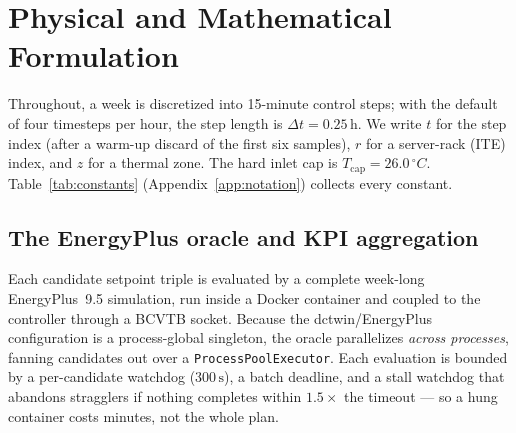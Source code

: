 \documentclass[11pt]{article}
\newcommand{\degC}{\ensuremath{^{\circ}}C}
\newcommand{\Tcap}{T_{\mathrm{cap}}}
\newcommand{\code}[1]{\texttt{\small #1}}
\begin{document}
\section{Physical and Mathematical Formulation}
\label{sec:formulation}

Throughout, a week is discretized into 15-minute control steps; with the default of four
timesteps per hour, the step length is \(\Delta t = 0.25\,\mathrm{h}\). We write \(t\) for
the step index (after a warm-up discard of the first six samples), \(r\) for a server-rack
(ITE) index, and \(z\) for a thermal zone. The hard inlet cap is
\(\Tcap = 26.0\,\degC\). Table~\ref{tab:constants} (Appendix~\ref{app:notation}) collects
every constant.

\subsection{The EnergyPlus oracle and KPI aggregation}
\label{sec:oracle}
Each candidate setpoint triple is evaluated by a complete week-long EnergyPlus~9.5
simulation, run inside a Docker container and coupled to the controller through a BCVTB
socket. Because the dctwin/EnergyPlus configuration is a process-global singleton, the
oracle parallelizes \emph{across processes}, fanning candidates out over a
\code{ProcessPoolExecutor}. Each evaluation is bounded by a per-candidate watchdog
(\(300\,\mathrm{s}\)), a batch deadline, and a stall watchdog that abandons stragglers if
nothing completes within \(1.5\times\) the timeout --- so a hung container costs minutes,
not the whole plan.
\end{document}
